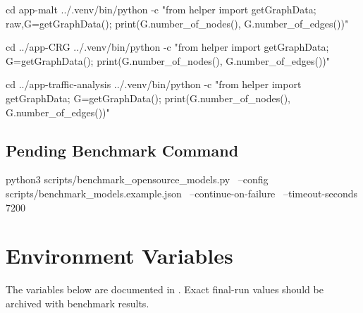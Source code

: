 \documentclass[11pt,a4paper]{article}
\begin{document}
\begin{commandbox}
cd app-malt
../.venv/bin/python -c "from helper import getGraphData; raw,G=getGraphData(); print(G.number_of_nodes(), G.number_of_edges())"

cd ../app-CRG
../.venv/bin/python -c "from helper import getGraphData; G=getGraphData(); print(G.number_of_nodes(), G.number_of_edges())"

cd ../app-traffic-analysis
../.venv/bin/python -c "from helper import getGraphData; G=getGraphData(); print(G.number_of_nodes(), G.number_of_edges())"
\end{commandbox}

\subsection{Pending Benchmark Command}

\begin{commandbox}
python3 scripts/benchmark_opensource_models.py \
  --config scripts/benchmark_models.example.json \
  --continue-on-failure \
  --timeout-seconds 7200
\end{commandbox}

\section{Environment Variables}

The variables below are documented in . Exact final-run values should be archived with benchmark results.
\end{document}
